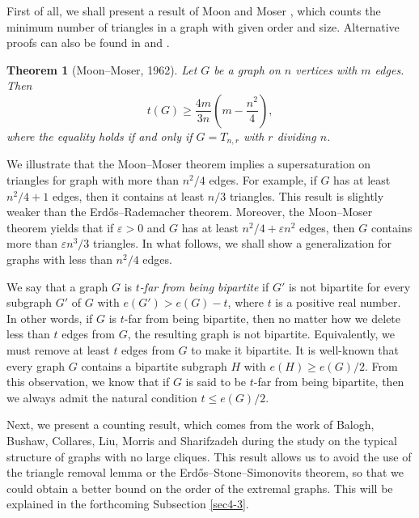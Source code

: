 \documentclass[11pt]{article}
\newtheorem{theorem}{Theorem}[section]
\begin{document}
First of all, 
we shall present a result of Moon and Moser \cite{MM1962}, 
which counts the minimum number of triangles in a graph with given order and size. 
Alternative proofs can also be found in \cite[p. 297]{Bollobas78} and \cite[p. 443]{Lov1979}. 

\begin{theorem}[Moon--Moser, 1962] \label{thm-MM-k3}
Let $G$ be a graph on $n$ vertices with $m$ edges. 
Then  
\[ t(G) \ge \frac{4m}{3n}\left(m- \frac{n^2}{4} \right), \]
where the equality holds if and only if $G=T_{n,r}$ with $r$ dividing $n$.  
\end{theorem}

We illustrate that the Moon--Moser theorem 
implies a supersaturation on triangles for graph with more than 
$n^2/4$ edges. 
For example,  if $G$ has at least ${n^2}/{4} +1$ edges, 
then it contains at least ${n}/{3}$ triangles.  
This result is slightly weaker than 
the Erd\H{o}s--Rademacher theorem. 
Moreover, the Moon--Moser theorem yields that 
if $\varepsilon >0$ and $G$ has  at least 
$ {n^2}/{4} + \varepsilon n^2$ edges,  
then $G$ contains more than ${\varepsilon} n^3/3$  triangles.  
In what follows, we shall show a generalization 
for graphs with less than $n^2/4$ edges. 

\medskip 
We say that a graph $G$ is  {\it $t$-far from being bipartite} 
if  $G'$ is not bipartite 
for every subgraph $G'$ of $G$ with 
$e(G')>  e(G) -t$, where $t$ is a positive real number.  
In other words, if $G$ is $t$-far from being bipartite, 
then no matter how we delete less than $t$ edges from $G$, 
the resulting graph is not bipartite. 
Equivalently, we must remove at least $t$ edges from 
$G$ to make it bipartite.  
It is well-known that every graph $G$ contains a bipartite subgraph $H$ 
with $e(H)\ge  e(G)/2$.  
From this  observation, we know that if  $G$ is said to be $t$-far from being bipartite, 
then we always admit the natural condition $t\le e(G)/2$.  

\medskip 


Next, we present a counting result, 
which comes from the work of  Balogh, Bushaw, Collares, Liu, Morris 
and  Sharifzadeh \cite{BBCLMS2017}  during the study on the typical structure of  graphs with no large cliques.  
This result allows us to avoid the use of the triangle removal lemma 
or the Erd\H{o}s--Stone--Simonovits theorem, 
so that we could obtain a better bound on the order of the extremal graphs.  
This will be explained in the forthcoming Subsection \ref{sec4-3}. 
\end{document}
